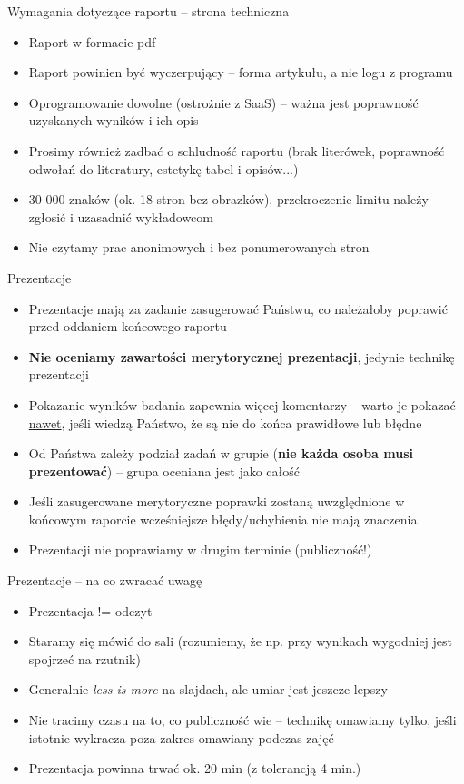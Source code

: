 \documentclass{beamer}
\begin{document}
\begin{frame}{Wymagania dotyczące raportu -- strona techniczna}
  \begin{itemize}
  \item Raport w formacie pdf
  \item Raport powinien być wyczerpujący -- forma artykułu, a nie logu z programu
  \item Oprogramowanie dowolne (ostrożnie z SaaS) -- ważna jest poprawność uzyskanych wyników i ich opis
  \item Prosimy również zadbać o schludność raportu (brak literówek, poprawność odwołań do literatury, estetykę tabel i opisów...)
  \item 30 000 znaków (ok. 18 stron bez obrazków), przekroczenie limitu należy zgłosić i uzasadnić wykładowcom
  \item Nie czytamy prac anonimowych i bez ponumerowanych stron
  \end{itemize}
\end{frame}

\begin{frame}{Prezentacje}
  \begin{itemize}
  \item Prezentacje mają za zadanie zasugerować Państwu, co należałoby poprawić przed oddaniem końcowego raportu
  \item \textbf{Nie oceniamy zawartości merytorycznej prezentacji}, jedynie technikę prezentacji
  \item Pokazanie wyników badania zapewnia więcej komentarzy -- warto je pokazać \underline{nawet}, jeśli wiedzą Państwo, że są nie do końca prawidłowe lub błędne
  \item Od Państwa zależy podział zadań w grupie (\textbf{nie każda osoba musi prezentować}) -- grupa oceniana jest jako całość
  \item Jeśli zasugerowane merytoryczne poprawki zostaną uwzględnione w końcowym raporcie wcześniejsze błędy/uchybienia nie mają znaczenia
  \item Prezentacji nie poprawiamy w drugim terminie (publiczność!)
  \end{itemize}
\end{frame}

\begin{frame}{Prezentacje -- na co zwracać uwagę}
  \begin{itemize}
  \item Prezentacja != odczyt
  \item Staramy się mówić do sali (rozumiemy, że np. przy wynikach wygodniej jest spojrzeć na rzutnik)
  \item Generalnie \emph{less is more} na slajdach, ale umiar jest jeszcze lepszy
  \item Nie tracimy czasu na to, co publiczność wie -- technikę omawiamy tylko, jeśli istotnie wykracza poza zakres omawiany podczas zajęć
  \item Prezentacja powinna trwać ok. 20 min (z tolerancją 4 min.)
  \end{itemize}
\end{frame}
\end{document}
